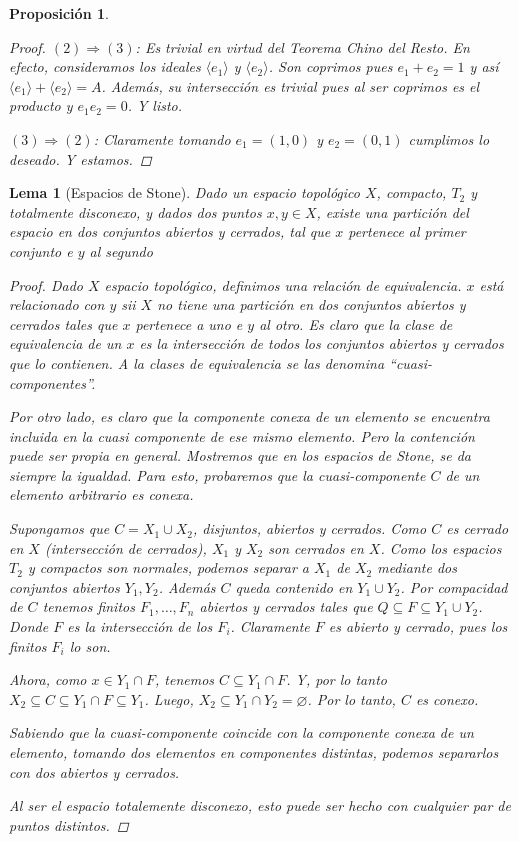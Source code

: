 \documentclass[11pt,a4paper, spanish,oneside,fleqn]{article}
\newtheorem{lem}[teo]{Lema}
\newtheorem{prop}[teo]{Proposición}
\theoremstyle{definition}
\let\emptyset\varnothing
\begin{document}
\begin{prop}
\begin{proof}
$(2)\Longrightarrow (3)$: Es trivial en virtud del Teorema Chino del Resto. En efecto, consideramos los ideales $\langle e_1\rangle$ y $\langle e_2\rangle$. Son coprimos pues $e_1 + e_2=1$ y así $\langle e_1\rangle + \langle e_2\rangle = A$. Además, su intersección es trivial pues al ser coprimos es el producto y $e_1e_2=0$. Y listo.

$(3)\Longrightarrow (2)$: Claramente tomando $e_1= (1,0)$ y $e_2=(0,1)$ cumplimos lo deseado. Y estamos.
\end{proof}
\end{prop}


\begin{lem}[Espacios de Stone]
Dado un espacio topol\'ogico $X$, compacto, $T_2$ y totalmente disconexo, y dados
dos puntos $x,y \in X$, existe una partici\'on del espacio en dos
conjuntos abiertos y cerrados, tal que $x$ pertenece al primer conjunto
e $y$ al segundo
\begin{proof}
Dado $X$ espacio topol\'ogico, definimos una relaci\'on de equivalencia. $x$ est\'a
relacionado con $y$ sii $X$ no tiene una partici\'on en dos conjuntos abiertos y
cerrados tales que $x$ pertenece a uno e $y$ al otro. Es claro que la clase de
equivalencia de un $x$ es la intersecci\'on de todos los conjuntos abiertos y
cerrados que lo contienen. A la clases de equivalencia se las denomina ``cuasi-componentes''.

Por otro lado, es claro que la componente conexa de un elemento se encuentra incluida
en la cuasi componente de ese mismo elemento. Pero la contenci\'on puede ser propia
en general. Mostremos que en los espacios de Stone, se da siempre la igualdad.
Para esto, probaremos que la cuasi-componente $C$ de un elemento arbitrario es conexa.

Supongamos que $C = X_1 \cup X_2$, disjuntos, abiertos y cerrados.
Como $C$ es cerrado en $X$ (intersecci\'on de cerrados), $X_1$ y $X_2$ son cerrados
en $X$.
Como los espacios $T_2$ y compactos son normales, podemos separar a $X_1$ de $X_2$
mediante dos conjuntos abiertos $Y_1,Y_2$. Adem\'as $C$ queda contenido en $Y_1 \cup Y_2$.
Por compacidad de $C$ tenemos finitos $F_1,\ldots,F_n$ abiertos y cerrados tales que
$Q\subseteq F \subseteq Y_1 \cup Y_2$. Donde $F$ es la intersecci\'on de los $F_i$.
Claramente $F$ es abierto y cerrado, pues los finitos $F_i$ lo son.

Ahora, como $x\in Y_1\cap F$, tenemos $C \subseteq Y_1\cap F$. Y, por lo tanto
$X_2 \subseteq C \subseteq Y_1 \cap F \subseteq Y_1$.
Luego, $X_2 \subseteq Y_1 \cap Y_2 = \emptyset$. Por lo tanto, $C$ es conexo.

Sabiendo que la cuasi-componente coincide con la componente conexa de un elemento,
tomando dos elementos en componentes distintas, podemos separarlos con dos abiertos
y cerrados.

Al ser el espacio totalemente disconexo, esto puede ser hecho con cualquier par
de puntos distintos.


\end{proof}
\end{lem}
\end{document}
